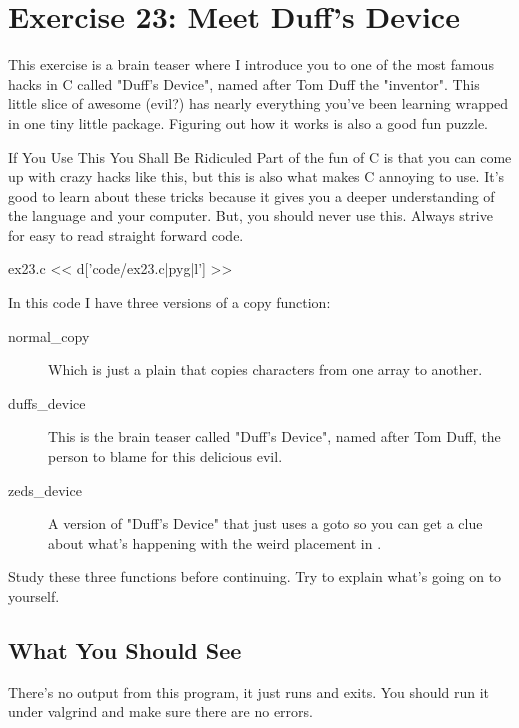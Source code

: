 \chapter{Exercise 23: Meet Duff's Device}

This exercise is a brain teaser where I introduce you to one of the
most famous hacks in C called "Duff's Device", named after Tom Duff
the "inventor".  This little slice of awesome (evil?) has nearly everything
you've been learning wrapped in one tiny little package.  Figuring out
how it works is also a good fun puzzle.

\begin{aside}{If You Use This You Shall Be Ridiculed}
Part of the fun of C is that you can come up with crazy hacks like this,
but this is also what makes C annoying to use.  It's good to learn about
these tricks because it gives you a deeper understanding of
the language and your computer.  But, you should never use this.  Always
strive for easy to read straight forward code.
\end{aside}


\begin{code}{ex23.c}
<< d['code/ex23.c|pyg|l'] >>
\end{code}

In this code I have three versions of a copy function:

\begin{description}
\item[normal\_copy] Which is just a plain  that copies
    characters from one array to another.
\item[duffs\_device] This is the brain teaser called "Duff's Device", named
    after Tom Duff, the person to blame for this delicious evil.
\item[zeds\_device] A version of "Duff's Device" that just uses a goto so
    you can get a clue about what's happening with the weird 
    placement in .
\end{description}

Study these three functions before continuing.  Try to explain what's
going on to yourself.


\section{What You Should See}

There's no output from this program, it just runs and exits.  You should
run it under valgrind and make sure there are no errors.

